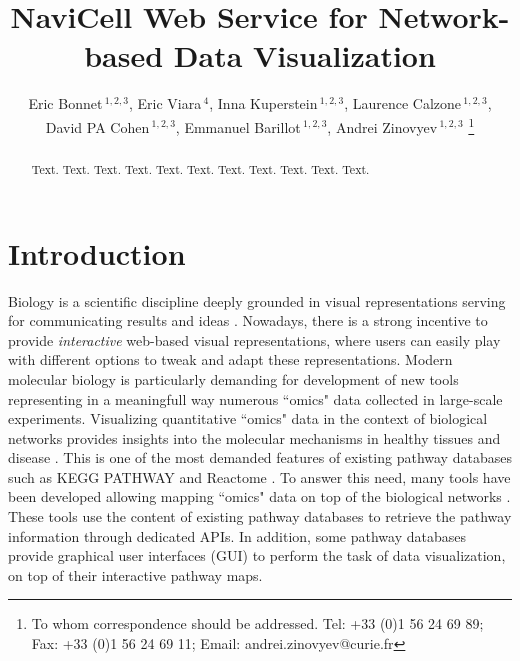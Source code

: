 \documentclass[a4,center,fleqn]{NAR}
\begin{document}
\title{NaviCell Web Service for Network-based Data Visualization}


\author{%
Eric Bonnet\,$^{1,2,3}$,
Eric Viara\,$^{4}$,
Inna Kuperstein\,$^{1,2,3}$,
Laurence Calzone\,$^{1,2,3}$,
David PA Cohen\,$^{1,2,3}$,
Emmanuel Barillot\,$^{1,2,3}$,
Andrei Zinovyev\,$^{1,2,3}$%
\footnote{To whom correspondence should be addressed.
Tel: +33 (0)1 56 24 69 89; Fax: +33 (0)1 56 24 69 11; Email: andrei.zinovyev@curie.fr}}

\address{%
$^{1}$Institut Curie, 26 rue d'Ulm, 75248 Paris, France, 
$^{2}$INSERM U900, 75248 Paris, France,
$^{3}$Mines ParisTech, 77300 Fontainebleau, France,
$^{4}$Sysra, 91330 Yerres, France.
}




\maketitle

\begin{abstract}
Text. Text. Text. Text. Text. Text. Text. Text. Text. Text. Text.
\end{abstract}


\section{Introduction}

Biology is a scientific discipline deeply grounded in visual representations serving for communicating results and ideas \cite{XXX}. Nowadays, there is a strong incentive to provide \emph{interactive} web-based visual representations, where users can easily play with different options to tweak and adapt these representations. Modern molecular biology is particularly demanding for development of new tools representing in a meaningfull way numerous ``omics" data collected in large-scale experiments. Visualizing quantitative ``omics" data in the context of biological networks provides insights into the molecular mechanisms in healthy tissues and disease \cite{Gehlenborg2010}. This is one of the most demanded features of existing pathway databases such as KEGG PATHWAY and Reactome \cite{Kanehisa2012, Croft2014}. To answer this need, many tools have been developed allowing mapping ``omics" data on top of the biological networks \cite{Arakawa2005,vanIersel2008,Luo2013, Nishida2014}. These tools use the content of existing pathway databases to retrieve the pathway information through dedicated APIs. In addition, some pathway databases provide graphical user interfaces (GUI) to perform the task of data visualization, on top of their interactive pathway maps.
\end{document}
